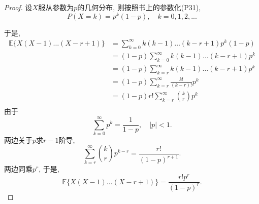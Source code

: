 \documentclass[UTF8, a4paper]{article}
\begin{document}
\begin{proof}
设\(X\)服从参数为\(p\)的几何分布, 则按照书上的参数化(P31), 
$$
P(X = k) = p^k (1-p), \quad k = 0,1,2,...
$$


于是,
$$
\begin{aligned}
    \mathbb{E}\{X(X-1) \ldots(X-r+1)\} &= \sum_{k=0}^{\infty} k(k-1) \ldots (k-r+1) p^k (1-p) \\
    &= (1 - p) \sum_{k = 0}^{\infty} k(k-1) \ldots (k-r+1) p^k \\
    &= (1 - p) \sum_{k = r}^{\infty} k(k-1) \ldots (k-r+1) p^k \\
    & = (1 - p) \sum_{k=r}^{\infty} \frac{k!}{(k-r)!} p^k \\
    &= (1 - p) r! \sum_{k=r}^{\infty} \binom{k}{r} p^k \\
\end{aligned}
$$
由于
$$
\sum_{k=0}^{\infty} p^k=\frac{1}{1-p}, \quad|p|<1 .
$$
两边关于\(p\)求\(r - 1\)阶导,
$$
\sum_{k = r}^{\infty} \binom{k}{r} p^{k-r} = \frac{r!}{(1-p)^{r+1}}.
$$
两边同乘\(p^r\), 于是, 
$$
\mathbb{E}\{X(X-1) \ldots(X-r+1)\} = \frac{r!p^r}{(1-p)^{r}}.
$$
\end{proof}


\end{document}
